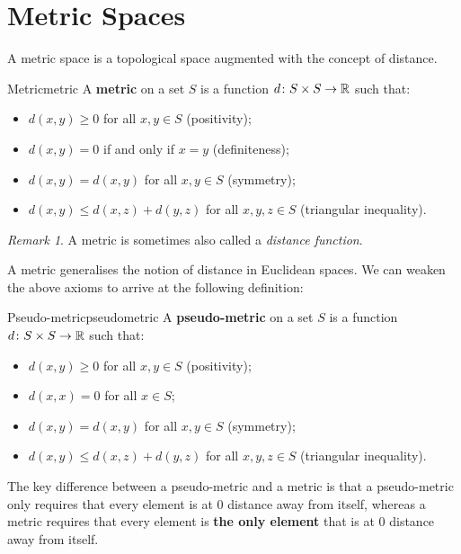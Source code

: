\documentclass[math]{amznotes}
\theoremstyle{remark}
\newtheorem*{remark}{Remark}
\begin{document}
\section{Metric Spaces}
A metric space is a topological space augmented with the concept of distance.
\begin{dfnbox}{Metric}{metric}
    A {\color{red} \textbf{metric}} on a set $S$ is a function $d \colon S \times S \to \mathbb{R}$ such that:
    \begin{itemize}
        \item $d\left(x, y\right) \geq 0$ for all $x, y \in S$ (positivity);
        \item $d\left(x, y\right) = 0$ if and only if $x = y$ (definiteness);
        \item $d\left(x, y\right) = d\left(x, y\right)$ for all $x, y \in S$ (symmetry);
        \item $d\left(x, y\right) \leq d\left(x, z\right) + d\left(y, z\right)$ for all $x, y, z \in S$ (triangular inequality).
    \end{itemize}
\end{dfnbox}
\begin{notebox}
    \begin{remark}
        A metric is sometimes also called a \textit{distance function}.
    \end{remark}
\end{notebox}
A metric generalises the notion of distance in Euclidean spaces. We can weaken the above axioms to arrive at the following definition:
\begin{dfnbox}{Pseudo-metric}{pseudometric}
    A {\color{red} \textbf{pseudo-metric}} on a set $S$ is a function $d \colon S \times S \to \mathbb{R}$ such that:
    \begin{itemize}
        \item $d\left(x, y\right) \geq 0$ for all $x, y \in S$ (positivity);
        \item $d\left(x, x\right) = 0$ for all $x \in S$;
        \item $d\left(x, y\right) = d\left(x, y\right)$ for all $x, y \in S$ (symmetry);
        \item $d\left(x, y\right) \leq d\left(x, z\right) + d\left(y, z\right)$ for all $x, y, z \in S$ (triangular inequality).
    \end{itemize}
\end{dfnbox}
The key difference between a pseudo-metric and a metric is that a pseudo-metric only requires that every element is at $0$ distance away from itself, whereas a metric requires that every element is \textbf{the only element} that is at $0$ distance away from itself.
\end{document}
